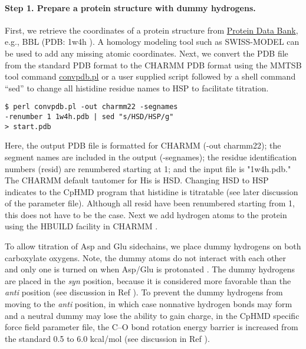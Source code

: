 \paragraph{Step 1. Prepare a protein structure with dummy hydrogens.}
First, we retrieve the coordinates of a protein structure
from \href{https://www.rcsb.org/}{Protein Data Bank}\cite{Berman_Bourne_2000_NucleicAcidsRes.},
e.g., BBL (PDB: 1w4h \cite{Ferguson_Fersht_2005_J.Mol.Biol.}).
A homology modeling tool such as SWISS-MODEL\cite{Waterhouse_Schwede_2018_NucleicAcidsRes.} 
can be used to add any missing atomic coordinates.
Next, we convert the PDB file from the standard PDB format to the CHARMM PDB format using the MMTSB tool command \cite{Feig_Brooks_2004_J.Mol.Graph.Model.} \href{http://blue11.bch.msu.edu/mmtsb/convpdb.pl}{convpdb.pl}
or a user supplied script followed by a shell command ``sed'' to
change all histidine residue names to HSP to facilitate titration.

%
\begin{lstlisting}
$ perl convpdb.pl -out charmm22 -segnames
-renumber 1 1w4h.pdb | sed "s/HSD/HSP/g" 
> start.pdb
\end{lstlisting}
%
Here, the output PDB file is formatted for CHARMM (-out charmm22); the segment names are included in the output (-segnames); the residue identification numbers (resid) are renumbered starting at 1; and 
the input file is "1w4h.pdb."
The CHARMM default tautomer for His is HSD.
Changing HSD to HSP indicates to the CpHMD program that histidine is titratable (see later discussion of the parameter file).
Although all resid have been renumbered starting from 1, this does not have to be the case.
Next we add hydrogen atoms to the protein using the HBUILD facility\cite{Brunger_Karplus_1988_Proteins} in CHARMM
\cite{Brooks_Karplus_2009_J.Comput.Chem.}.

To allow titration of Asp and Glu sidechains, we place dummy hydrogens on both carboxylate oxygens.
Note, the dummy atoms do not interact with each other 
and only one is turned on when Asp/Glu is protonated
\cite{Khandogin_Brooks_2005_Biophys.J.}.
The dummy hydrogens are placed in the \textit{syn} position, 
because it is considered
more favorable than the \textit{anti} position
(see discussion in Ref \cite{Khandogin_Brooks_2005_Biophys.J.}).
To prevent the dummy hydrogens from moving to the \textit{anti} position, in which case nonnative hydrogen bonds may form
and a neutral dummy may lose the ability to gain charge,
in the CpHMD specific force field parameter file,
the C--O bond rotation energy barrier
is increased from the standard 0.5 to 6.0 kcal/mol
(see discussion in Ref \cite{Khandogin_Brooks_2005_Biophys.J.}).

